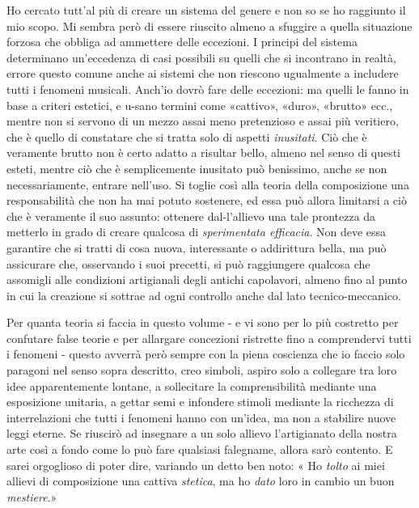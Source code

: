 Ho cercato tutt'al più di creare un sistema del genere e non so se ho raggiunto il mio scopo. Mi sembra però di essere riuscito almeno a sfuggire a quella situazione forzosa che obbliga ad ammettere delle eccezioni.
I principi del sistema determinano un'eccedenza di casi possibili su quelli che si incontrano in realtà, errore questo comune anche ai sistemi che non riescono ugualmente a includere tutti i fenomeni musicali. Anch'io dovrò fare delle eccezioni: ma quelli le fanno in base a criteri estetici, e u-sano termini come «cattivo», «duro», «brutto» ecc., mentre non si servono di un mezzo assai meno pretenzioso e assai più veritiero, che è quello di constatare che si tratta solo di aspetti \emph{inusitati}. Ciò che è veramente brutto non è certo adatto a risultar bello, almeno nel senso di questi esteti, mentre ciò che è semplicemente inusitato può benissimo, anche se non necessariamente, entrare nell'uso. Si toglie così alla teoria della composizione una responsabilità che non ha mai potuto sostenere, ed essa può allora limitarsi a ciò che è veramente il suo assunto: ottenere dal-l'allievo una tale prontezza da metterlo in grado di creare qualcosa di \emph{sperimentata efficacia}. Non deve essa garantire che si tratti di cosa nuova, interessante o addirittura bella, ma può assicurare che, osservando i suoi precetti, si può raggiungere qualcosa che assomigli alle condizioni artigianali degli antichi capolavori, almeno fino al punto in cui la creazione si sottrae ad ogni controllo anche dal lato tecnico-meccanico.

Per quanta teoria si faccia in questo volume - e vi sono per lo più costretto per confutare false teorie e per allargare concezioni ristrette fino a comprendervi tutti i fenomeni - questo avverrà però sempre con la piena coscienza che io faccio solo paragoni nel senso sopra descritto, creo simboli, aspiro solo a collegare tra loro idee apparentemente lontane, a sollecitare la comprensibilità mediante una esposizione unitaria, a gettar semi e infondere stimoli mediante la ricchezza di interrelazioni che tutti i fenomeni hanno con un'idea, ma non a stabilire nuove leggi eterne. Se riuscirò ad insegnare a un solo allievo l'artigianato della nostra arte così a fondo come lo può fare qualsiasi falegname, allora sarò contento. E sarei orgoglioso di poter dire, variando un detto ben noto: « Ho \emph{tolto} ai miei allievi di composizione una cattiva \emph{stetica}, ma ho \emph{dato} loro in cambio un buon \emph{mestiere}.»
